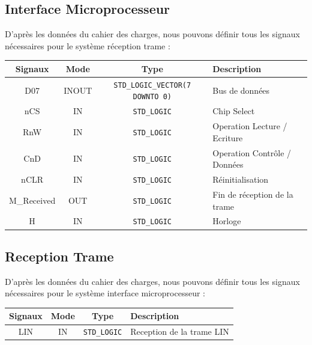 \subsection{Interface Microprocesseur}

D'après les données du cahier des charges, nous pouvons définir tous les signaux nécessaires pour 
le système réception trame : 

\begin{center}
\renewcommand{\arraystretch}{1.2} %
\small %
\begin{tabularx}{\textwidth}{|c||c|c|X|}
    \hline			
    \textbf{Signaux} & \textbf{Mode} & \textbf{Type} & \textbf{Description}  \\ \hline 
    D07 & INOUT & \texttt{STD\_LOGIC\_VECTOR(7 DOWNTO 0)} & Bus de données \\
    nCS & IN & \texttt{STD\_LOGIC} & Chip Select \\
    RnW & IN & \texttt{STD\_LOGIC} & Operation Lecture / Ecriture \\
    CnD & IN & \texttt{STD\_LOGIC} & Operation Contrôle / Données \\
    nCLR & IN & \texttt{STD\_LOGIC} & Réinitialisation \\
    M\_Received & OUT & \texttt{STD\_LOGIC} & Fin de réception de la trame \\
    H & IN & \texttt{STD\_LOGIC} & Horloge \\
    \hline  
\end{tabularx}
\end{center}


\subsection{Reception Trame}

D'après les données du cahier des charges, nous pouvons définir tous les signaux nécessaires pour le système interface microprocesseur : 

\begin{center}
\renewcommand{\arraystretch}{1.2} %
\small %
\begin{tabularx}{\textwidth}{|c||c|c|X|}
    \hline			
    \textbf{Signaux} & \textbf{Mode} & \textbf{Type} & \textbf{Description}  \\ \hline 
    LIN & IN & \texttt{STD\_LOGIC} & Reception de la trame LIN \\
    \hline  
\end{tabularx}
\end{center}

